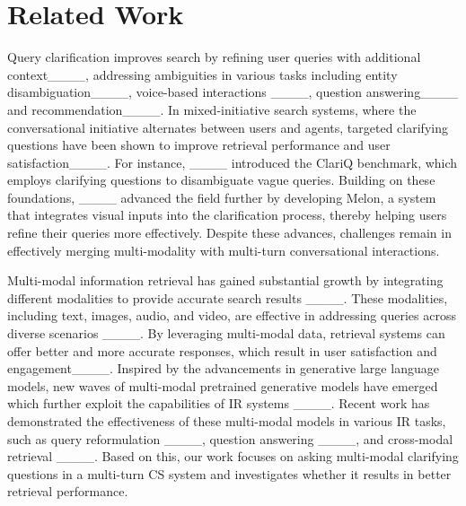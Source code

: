 \section{Related Work}
Query clarification improves search by refining user queries with additional context____, addressing ambiguities in various tasks including entity disambiguation____, voice-based interactions ____, question answering____ and recommendation____.
In mixed-initiative search systems, where the conversational initiative alternates between users and agents, targeted clarifying questions have been shown to improve retrieval performance and user satisfaction____. For instance, ____ introduced the ClariQ benchmark, which employs clarifying questions to disambiguate vague queries. Building on these foundations, ____ advanced the field further by developing Melon, a system that integrates visual inputs into the clarification process, thereby helping users refine their queries more effectively. Despite these advances, challenges remain in effectively merging multi-modality with multi-turn conversational interactions.









 Multi-modal information retrieval has gained substantial growth by integrating different modalities to provide accurate search results ____. These modalities, including text, images, audio, and video, are effective in addressing queries across diverse scenarios ____. By leveraging multi-modal data, retrieval systems can offer better and more accurate responses, which result in user satisfaction and engagement____. Inspired by the advancements in generative large language models, new waves of multi-modal pretrained generative models have emerged which further exploit the capabilities of IR systems ____. Recent work has demonstrated the effectiveness of these multi-modal models in various IR tasks, such as query reformulation ____, question answering ____, and cross-modal retrieval ____. Based on this, our work focuses on asking multi-modal clarifying questions in a multi-turn \ac{CS} system and investigates whether it results in better retrieval performance.